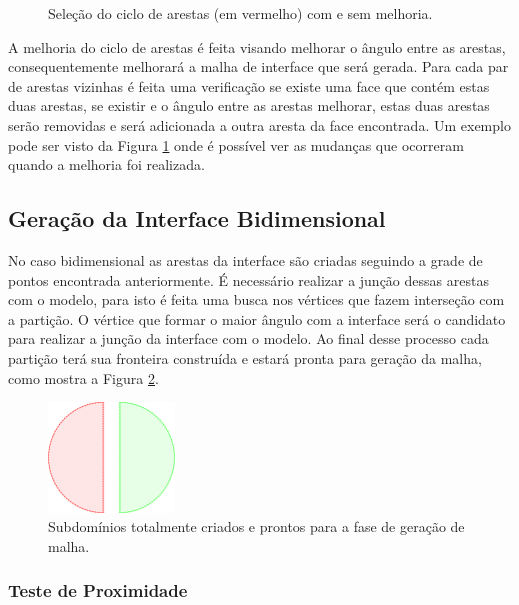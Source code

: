 \begin{figure}[ht]
{	}
	\caption{Seleção do ciclo de arestas (em vermelho) com e sem melhoria.}
	\label{fig:melhoria_arestas_apriori}
\end{figure}


A melhoria do ciclo de arestas é feita visando melhorar o ângulo entre as arestas, consequentemente melhorará a malha de interface que será gerada. Para cada par de arestas vizinhas é feita uma verificação se existe uma face que contém estas duas arestas, se existir e o ângulo entre as arestas melhorar, estas duas arestas serão removidas e será adicionada a outra aresta da face encontrada. Um exemplo pode ser visto da Figura \ref{fig:melhoria_arestas_apriori} onde é possível ver as mudanças que ocorreram quando a melhoria foi realizada.

\subsection{Geração da Interface Bidimensional}

No caso bidimensional as arestas da interface são criadas seguindo a grade de pontos encontrada anteriormente. É necessário realizar a junção dessas arestas com o modelo, para isto é feita uma busca nos vértices que fazem interseção com a partição. O vértice que formar o maior ângulo com a interface será o candidato para realizar a junção da interface com o modelo. Ao final desse processo cada partição terá sua fronteira construída e estará pronta para geração da malha, como mostra a Figura \ref{fig:subdominios2D_montados}.


\begin{figure}[!ht]
	\centering
	\includegraphics[width=0.3\textwidth]{fig/subdominios2D_montados.png}
	\caption{Subdomínios totalmente criados e prontos para a fase de geração de malha.}
	\label{fig:subdominios2D_montados}
\end{figure}


\subsubsection{Teste de Proximidade}
\label{sec:Teste_proximidade}

